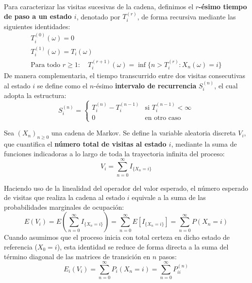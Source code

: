 \documentclass[10pt]{book}
\newcommand{\tbf}{\textbf}
\begin{document}
\begin{definicion}
    Para caracterizar las visitas sucesivas de la cadena, definimos el \tbf{$r$-ésimo tiempo de paso a un estado $i$}, denotado por $T_i^{(r)}$, de forma recursiva mediante las siguientes identidades:
    \[
    \begin{array}{l}
        T_i^{(0)}(\omega) = 0 \\
        T_i^{(1)}(\omega) = T_i(\omega) \\
        \text{Para todo } r \geq 1: \quad T_i^{(r+1)}(\omega) = \inf\{n > T_i^{(r)} : X_n(\omega) = i\}
    \end{array}
    \]
    De manera complementaria, el tiempo transcurrido entre dos visitas consecutivas al estado $i$ se define como el $n$-ésimo \textbf{intervalo de recurrencia} $S_i^{(n)}$, el cual adopta la estructura:
    \[
    S_i^{(n)} = \begin{cases} T_i^{(n)} - T_i^{(n-1)} & \text{si } T_i^{(n-1)} < \infty \\ 0 & \text{en otro caso} \end{cases}
    \]
\end{definicion}


\begin{definicion}
    Sea $(X_n)_{n \geq 0}$ una cadena de Markov. Se define la variable aleatoria discreta $V_i$, que cuantifica el \textbf{número total de visitas al estado $i$}, mediante la suma de funciones indicadoras a lo largo de toda la trayectoria infinita del proceso:
    \[
    V_i = \sum_{n=0}^{\infty} I_{\{X_n = i\}}
    \]
\end{definicion}


\begin{observacion}
    Haciendo uso de la linealidad del operador del valor esperado, el número esperado de visitas que realiza la cadena al estado $i$ equivale a la suma de las probabilidades marginales de ocupación:
    \[
    E(V_i) = E\left( \sum_{n=0}^{\infty} I_{\{X_n = i\}} \right) = \sum_{n=0}^{\infty} E\left[ I_{\{X_n = i\}} \right] = \sum_{n=0}^{\infty} P(X_n = i)
    \]
    Cuando asumimos que el proceso inicia con total certeza en dicho estado de referencia ($X_0 = i$), esta identidad se reduce de forma directa a la suma del término diagonal de las matrices de transición en $n$ pasos:
    \[
    E_i(V_i) = \sum_{n=0}^{\infty} P_i(X_n = i) = \sum_{n=0}^{\infty} P_{ii}^{(n)}
    \]
\end{observacion}
\end{document}
